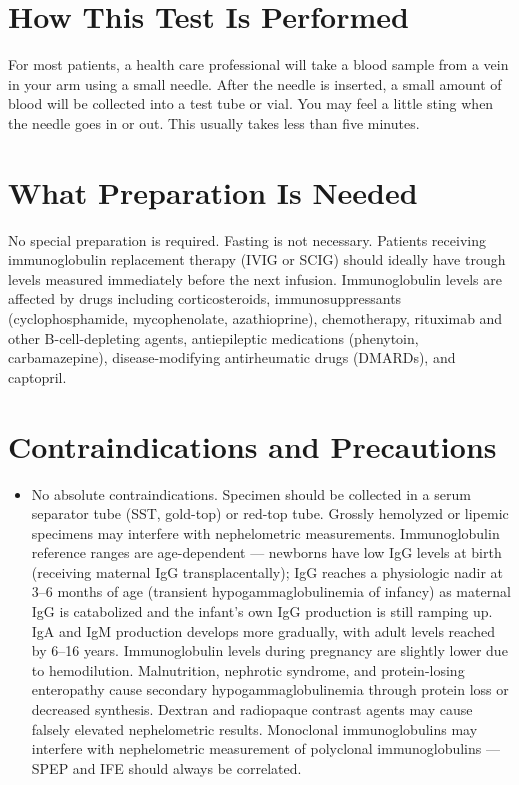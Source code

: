 \section*{How This Test Is Performed}
For most patients, a health care professional will take a blood sample from a vein in your arm using a small needle. After the needle is inserted, a small amount of blood will be collected into a test tube or vial. You may feel a little sting when the needle goes in or out. This usually takes less than five minutes.

\section*{What Preparation Is Needed}
No special preparation is required. Fasting is not necessary. Patients receiving immunoglobulin replacement therapy (IVIG or SCIG) should ideally have trough levels measured immediately before the next infusion. Immunoglobulin levels are affected by drugs including corticosteroids, immunosuppressants (cyclophosphamide, mycophenolate, azathioprine), chemotherapy, rituximab and other B-cell-depleting agents, antiepileptic medications (phenytoin, carbamazepine), disease-modifying antirheumatic drugs (DMARDs), and captopril.

\section*{Contraindications and Precautions}
\begin{itemize}
  \item No absolute contraindications. Specimen should be collected in a serum separator tube (SST, gold-top) or red-top tube. Grossly hemolyzed or lipemic specimens may interfere with nephelometric measurements. Immunoglobulin reference ranges are age-dependent --- newborns have low IgG levels at birth (receiving maternal IgG transplacentally); IgG reaches a physiologic nadir at 3--6 months of age (transient hypogammaglobulinemia of infancy) as maternal IgG is catabolized and the infant's own IgG production is still ramping up. IgA and IgM production develops more gradually, with adult levels reached by 6--16 years. Immunoglobulin levels during pregnancy are slightly lower due to hemodilution. Malnutrition, nephrotic syndrome, and protein-losing enteropathy cause secondary hypogammaglobulinemia through protein loss or decreased synthesis. Dextran and radiopaque contrast agents may cause falsely elevated nephelometric results. Monoclonal immunoglobulins may interfere with nephelometric measurement of polyclonal immunoglobulins --- SPEP and IFE should always be correlated.
\end{itemize}
